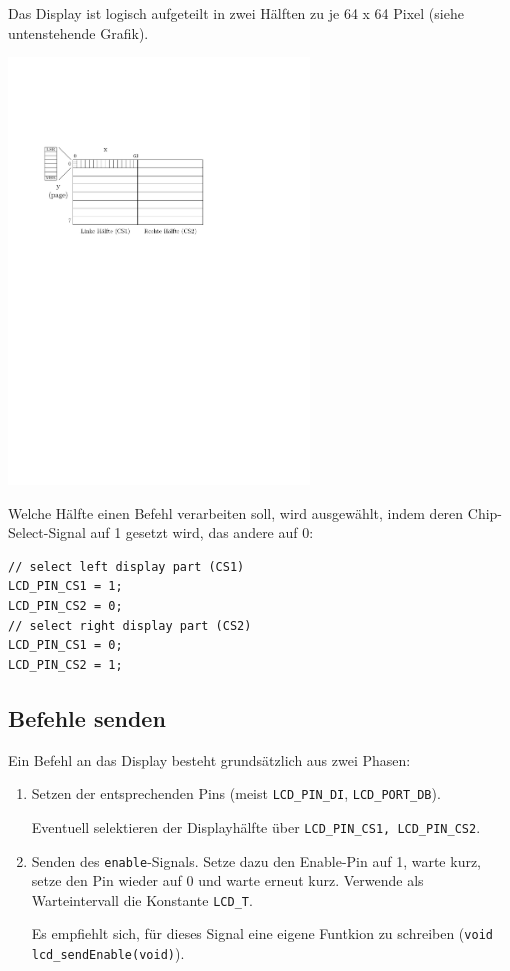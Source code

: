 Das Display ist logisch aufgeteilt in zwei Hälften zu je 64 x 64 Pixel (siehe untenstehende Grafik).
\begin{center}
	\includegraphics[width=0.6\textwidth]{figures/display_aufbau}
\end{center}

Welche Hälfte einen Befehl verarbeiten soll, wird ausgewählt, indem deren Chip-Select-Signal auf 1 gesetzt wird, das andere auf 0:
\begin{lstlisting}
// select left display part (CS1)
LCD_PIN_CS1 = 1;
LCD_PIN_CS2 = 0;
// select right display part (CS2)
LCD_PIN_CS1 = 0;
LCD_PIN_CS2 = 1;
\end{lstlisting}

\subsection*{Befehle senden}
Ein Befehl an das Display besteht grundsätzlich aus zwei Phasen:
\begin{enumerate}
\item
Setzen der entsprechenden Pins (meist \texttt{LCD\_PIN\_DI}, \texttt{LCD\_PORT\_DB}).

Eventuell selektieren der Displayhälfte über \texttt{LCD\_PIN\_CS1, LCD\_PIN\_CS2}.

\item
Senden des \texttt{enable}-Signals.
Setze dazu den Enable-Pin auf 1, warte kurz, setze den Pin wieder auf 0 und warte erneut kurz.
Verwende als Warteintervall die Konstante \texttt{LCD\_T}.

Es empfiehlt sich, für dieses Signal eine eigene Funtkion zu schreiben (\texttt{void lcd\_sendEnable(void)}).
\end{enumerate}

